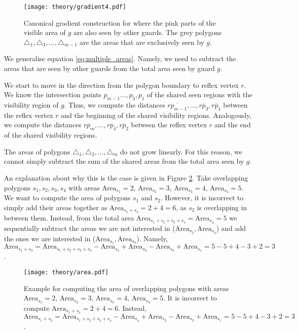 \begin{figure}[h!]
    \centering
    \texttt{[image: theory/gradient4.pdf]}
    \caption{Canonical gradient construction for where the pink parts of the visible area of $g$ are also seen by other guards. The grey polygons $\triangle_1, \triangle_3, ..., \triangle_{m - 1}$ are the areas that are exclusively seen by $g$.}
    \label{fig:general_gradient} 
\end{figure}

We generalise equation \ref{eq:multiple_areas}. Namely, we need to subtract the areas that are seen by other guards from the total area seen by guard $g$. 

We start to move in the direction from the polygon boundary to reflex vertex $r$. We know the intersection points $p_{m - 1} ..., p_3, p_1$ of the shared seen regions with the visibility region of $g$. Thus, we  compute the distances $\overline{rp_{m - 1}}, ..., \overline{rp_3}, \overline{rp_1}$ between the reflex vertex $r$ and the beginning of the shared visibility regions. Analogously, we  compute the distances $\overline{rp_m}, ...,  \overline{rp_4}, \overline{rp_2}$ between the reflex vertex $r$ and the end of the shared visibility regions.

The areas of polygons $\triangle_1, \triangle_2, ..., \triangle_m$ do not grow linearly. For this reason, we cannot simply subtract the sum of the shared areas from the total area seen by $g$. 

An explanation about why this is the case is given in Figure \ref{fig:areas}. Take overlapping polygons $s_1, s_2, s_3, s_4$ with areas $\text{Area}_{s_1} = 2$, $\text{Area}_{s_2} = 3$, $\text{Area}_{s_3} = 4$, $\text{Area}_{s_4} = 5$. We want to compute the area of polygons $s_1$ and $s_2$. However, it is incorrect to simply add their areas together as $\text{Area}_{s_1 + s_3} = 2 + 4 = 6$, as $s_2$ is overlapping in between them. Instead, from the total area $\text{Area}_{s_1 + s_2 + s_3 + s_4} = \text{Area}_{s_4} = 5$ we  sequentially subtract the areas we are not interested in ($\text{Area}_{s_2}, \text{Area}_{s_4}$) and add the ones we are interested in ($\text{Area}_{s_1}, \text{Area}_{s_3}$). Namely, $\text{Area}_{s_1 + s_3} = \text{Area}_{s_1 + s_2 + s_3 + s_4} - \text{Area}_{s_4} + \text{Area}_{s_3} - \text{Area}_{s_2} + \text{Area}_{s_1} = 5 - 5 + 4 - 3 + 2 = 3$.

\begin{figure}[h!]
    \centering
    \texttt{[image: theory/area.pdf]}
    \caption{Example for computing the area of overlapping polygons with areas $\text{Area}_{s_1} = 2$, $\text{Area}_{s_2} = 3$, $\text{Area}_{s_3} = 4$, $\text{Area}_{s_4} = 5$. It is incorrect to compute $\text{Area}_{s_1 + s_3} = 2 + 4 = 6$. Instead, $\text{Area}_{s_1 + s_3} = \text{Area}_{s_1 + s_2 + s_3 + s_4} - \text{Area}_{s_4} + \text{Area}_{s_3} - \text{Area}_{s_2} + \text{Area}_{s_1} = 5 - 5 + 4 - 3 + 2 = 3$.}
    \label{fig:areas}
\end{figure}

